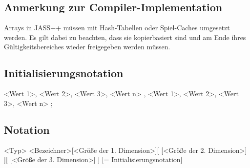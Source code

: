 \subsection{Anmerkung zur Compiler-Implementation}
Arrays in JASS++ müssen mit Hash-Tabellen oder Spiel-Caches umgesetzt werden. Es gilt dabei zu beachten, dass sie kopierbasiert sind
und am Ende ihres Gültigkeitsbereiches wieder freigegeben werden müssen.

\subsection{Initialisierungsnotation}
{ { <Wert 1>, <Wert 2>, <Wert 3>, <Wert n> }, { <Wert 1>, <Wert 2>, <Wert 3>, <Wert n> } };

\subsection{Notation}
<Typ> <Bezeichner>[<Größe der 1. Dimension>][ [<Größe der 2. Dimension>] ][ [<Größe der 3. Dimension>] ] [= Initialisierungsnotation]